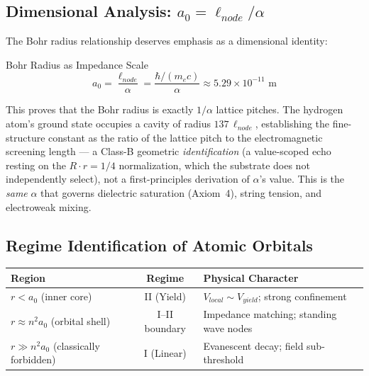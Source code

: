 \subsection{Dimensional Analysis: $a_0 = \ell_{node}/\alpha$}

The Bohr radius relationship deserves emphasis as a dimensional identity:
\begin{resultbox}{Bohr Radius as Impedance Scale}
\begin{equation}
    a_0 = \frac{\ell_{node}}{\alpha} = \frac{\hbar/(m_e c)}{\alpha} \approx 5.29 \times 10^{-11} \text{ m}
\end{equation}
\end{resultbox}
This proves that the Bohr radius is exactly $1/\alpha$ lattice pitches. The hydrogen atom's ground state occupies a cavity of radius $137\,\ell_{node}$, establishing the fine-structure constant as the ratio of the lattice pitch to the electromagnetic screening length --- a Class-B geometric \emph{identification} (a value-scoped echo resting on the $R\cdot r = 1/4$ normalization, which the substrate does not independently select), not a first-principles derivation of $\alpha$'s value. This is the \emph{same} $\alpha$ that governs dielectric saturation (Axiom~4), string tension, and electroweak mixing.

\subsection{Regime Identification of Atomic Orbitals}

\begin{center}
\small
\renewcommand{\arraystretch}{1.2}
\begin{tabularx}{\textwidth}{@{}l c X@{}}
\toprule
\textbf{Region} & \textbf{Regime} & \textbf{Physical Character} \\
\midrule
$r < a_0$ (inner core) & II (Yield) & $V_{local} \sim V_{yield}$; strong confinement \\
$r \approx n^2 a_0$ (orbital shell) & I--II boundary & Impedance matching; standing wave nodes \\
$r \gg n^2 a_0$ (classically forbidden) & I (Linear) & Evanescent decay; field sub-threshold \\
\bottomrule
\end{tabularx}
\end{center}

